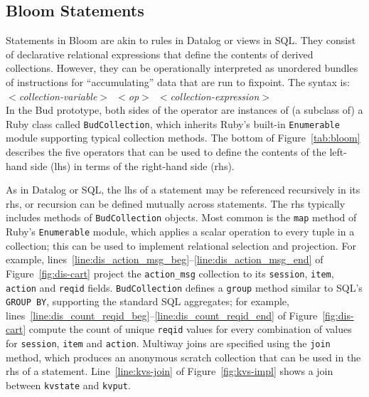 \subsection{Bloom Statements}
Statements in Bloom are akin to rules in Datalog or views in SQL.  They consist
of declarative relational expressions that define the contents of derived
collections.  However, they can be operationally interpreted as unordered bundles of instructions for ``accumulating'' data that are run to fixpoint.   The syntax is:\\ \noindent
\mbox{\hspace{0.25in}\emph{$<$collection-variable$>$ $<$op$>$
$<$collection-expression$>$}}\\ \noindent In the Bud prototype, both sides of
the operator are instances of (a subclass of) a Ruby class called
\texttt{BudCollection}, which inherits Ruby's built-in \texttt{Enumerable}
module supporting typical collection methods.  The bottom of Figure~\ref{tab:bloom} describes
the five operators that can be used to define the contents of the left-hand
side (lhs) in terms of the right-hand side (rhs).  

As in Datalog or SQL, the lhs of a statement may be referenced recursively in
its rhs, or recursion can be defined mutually across statements.  The rhs
typically includes methods of \texttt{BudCollection} objects.  Most common is
the \texttt{map} method of Ruby's \texttt{Enumerable} module, which applies a
scalar operation to every tuple in a collection; this can be used to implement
relational selection and projection. For example, 
lines~\ref{line:dis_action_msg_beg}--\ref{line:dis_action_msg_end} of
Figure~\ref{fig:dis-cart} project the \texttt{action\_msg} collection to
its \texttt{session}, \texttt{item}, \texttt{action} and \texttt{reqid} fields.
\texttt{BudCollection} defines a \texttt{group} method similar to SQL's
\texttt{GROUP BY}, supporting the standard SQL aggregates; for example,
lines~\ref{line:dis_count_reqid_beg}--\ref{line:dis_count_reqid_end} of
Figure~\ref{fig:dis-cart} compute the count of unique \texttt{reqid}
values for every combination of values for \texttt{session}, \texttt{item} and
\texttt{action}.  Multiway joins are specified using the \texttt{join} method,
which produces an anonymous scratch collection that can be used in the
rhs of a statement. Line~\ref{line:kvs-join} of
Figure~\ref{fig:kvs-impl} shows a join between \texttt{kvstate} and
\texttt{kvput}.

